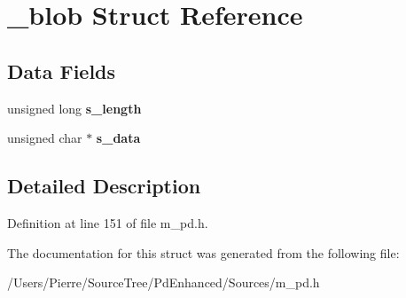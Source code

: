 \hypertarget{struct__blob}{\section{\-\_\-blob Struct Reference}
\label{struct__blob}
}
\subsection*{Data Fields}
\begin{DoxyCompactItemize}
\item 
\hypertarget{struct__blob_afd8a89c182f30bac5fa9635b53cadad1}{unsigned long {\bfseries s\-\_\-length}}\label{struct__blob_afd8a89c182f30bac5fa9635b53cadad1}

\item 
\hypertarget{struct__blob_a21e25a335e3d94e7865f7f1fd9b6f3ea}{unsigned char $\ast$ {\bfseries s\-\_\-data}}\label{struct__blob_a21e25a335e3d94e7865f7f1fd9b6f3ea}

\end{DoxyCompactItemize}


\subsection{Detailed Description}


Definition at line 151 of file m\-\_\-pd.\-h.



The documentation for this struct was generated from the following file\-:\begin{DoxyCompactItemize}
\item 
/\-Users/\-Pierre/\-Source\-Tree/\-Pd\-Enhanced/\-Sources/m\-\_\-pd.\-h\end{DoxyCompactItemize}
